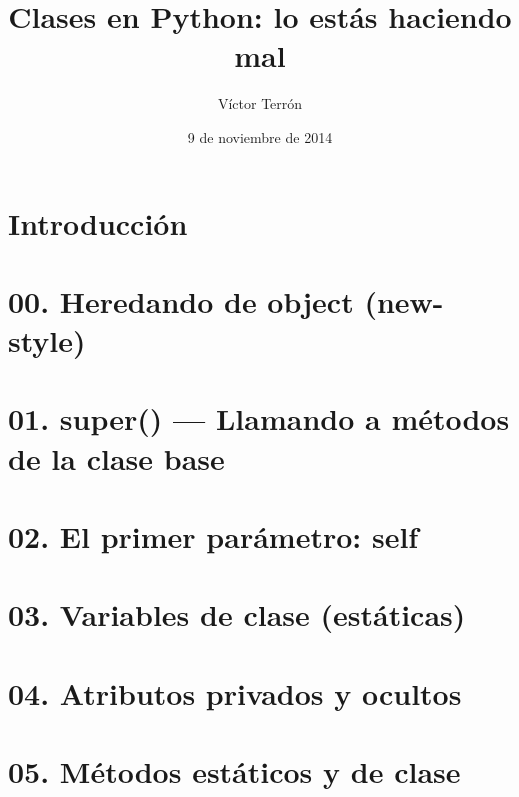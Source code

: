 \documentclass[14pt]{beamer}
\title{Clases en Python: lo estás haciendo mal}
\author{Víctor Terrón}
\date{9 de noviembre de 2014}
\institute{IAA-CSIC}
\newcommand{\punto}[1]{}
\begin{document}
\section{Introducción}


\section{00. Heredando de object (new-style)}
\punto{00}

\section{01. super() — Llamando a métodos de la clase base}
\punto{01}

\section{02. El primer parámetro: self}
\punto{02}

\section{03. Variables de clase (estáticas)}
\punto{03}

\section{04. Atributos privados y ocultos}
\punto{04}

\section{05. Métodos estáticos y de clase}
\punto{05}
\end{document}
